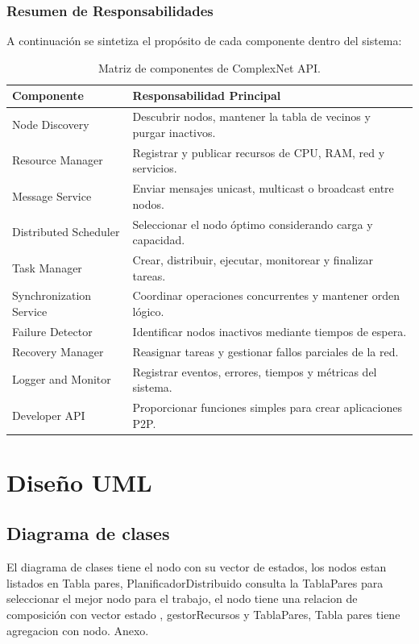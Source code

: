\documentclass{article}
\begin{document}
\subsubsection{Resumen de Responsabilidades}
A continuación se sintetiza el propósito de cada componente dentro del sistema:

\begin{table}[h!]
\centering
\small
\begin{tabular}{|l|p{9.5cm}|}
\hline
\textbf{Componente} & \textbf{Responsabilidad Principal} \\ \hline
Node Discovery & Descubrir nodos, mantener la tabla de vecinos y purgar inactivos. \\ \hline
Resource Manager & Registrar y publicar recursos de CPU, RAM, red y servicios. \\ \hline
Message Service & Enviar mensajes unicast, multicast o broadcast entre nodos. \\ \hline
Distributed Scheduler & Seleccionar el nodo óptimo considerando carga y capacidad. \\ \hline
Task Manager & Crear, distribuir, ejecutar, monitorear y finalizar tareas. \\ \hline
Synchronization Service & Coordinar operaciones concurrentes y mantener orden lógico. \\ \hline
Failure Detector & Identificar nodos inactivos mediante tiempos de espera. \\ \hline
Recovery Manager & Reasignar tareas y gestionar fallos parciales de la red. \\ \hline
Logger and Monitor & Registrar eventos, errores, tiempos y métricas del sistema. \\ \hline
Developer API & Proporcionar funciones simples para crear aplicaciones P2P. \\ \hline
\end{tabular}
\caption{Matriz de componentes de ComplexNet API.}
\label{tab:componentes_api}
\end{table}

\section{Diseño UML}
\subsection{Diagrama de clases}
El diagrama de clases tiene el nodo con su vector de estados, los nodos estan listados en Tabla pares, PlanificadorDistribuido consulta la TablaPares para seleccionar el mejor nodo para el trabajo, el nodo tiene una relacion de composición con vector estado , gestorRecursos y TablaPares, Tabla pares tiene agregacion con nodo. Anexo.
\end{document}
